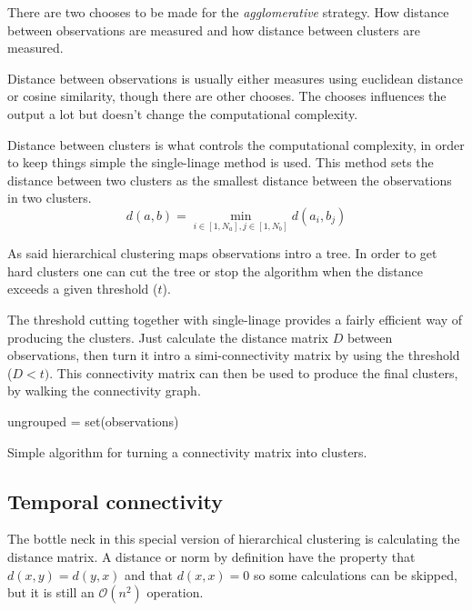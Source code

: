 There are two chooses to be made for the \textit{agglomerative} strategy.  How distance between observations are measured and how distance between clusters are measured.

Distance between observations is usually either measures using euclidean distance or cosine similarity, though there are other chooses. The chooses influences the output a lot but doesn't change the computational complexity.

Distance between clusters is what controls the computational complexity, in order to keep things simple the single-linage method is used. This method sets the distance between two clusters as the smallest distance between the observations in two clusters.
\begin{equation}
d(a, b) = \min_{i \in [1, N_a], j \in [1, N_b]} d(a_i, b_j)
\end{equation}

As said hierarchical clustering maps observations intro a tree. In order to get hard clusters one can cut the tree or stop the algorithm when the distance exceeds a given threshold ($t$).

The threshold cutting together with single-linage provides a fairly efficient way of producing the clusters. Just calculate the distance matrix $D$ between observations, then turn it intro a simi-connectivity matrix by using the threshold ($D < t)$. This connectivity matrix can then be used to produce the final clusters, by walking the connectivity graph.

\begin{algorithm}[h]
 \DontPrintSemicolon
 ungrouped = set(observations)\;
 \caption{Simple algorithm for turning a connectivity matrix into clusters.}
\end{algorithm}

\subsection{Temporal connectivity}

The bottle neck in this special version of hierarchical clustering is calculating the distance matrix. A distance or norm by definition have the property that $d(x,y) = d(y,x)$ and that $d(x,x) = 0$ so some calculations can be skipped, but it is still an $\mathcal{O}(n^2)$ operation.

